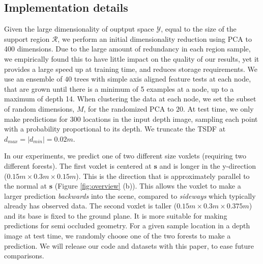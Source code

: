 \documentclass[10pt,twocolumn,letterpaper]{article}
\newcommand{\pixelidx}{\mathbf{s}}
\newcommand{\voxelgrid}{\mathcal{V}}
\newcommand{\note}[1]{\textcolor{blue}{NOTE: #1}}
\begin{document}
\subsection{Implementation details}
Given the large dimensionality of ouptput space $\mathcal{Y}$, equal to the size of the support region $\mathcal{R}$, we perform an initial dimensionality reduction using PCA to 400 dimensions.
Due to the large amount of redundancy in each region sample, we empirically found this to have little impact on the quality of our results, yet it provides a large speed up at training time, and reduces storage requirements.
We use an ensemble of $40$ trees with simple axis aligned feature tests at each node, that are grown until there is a minimum of 5 examples at a node, up to a maximum of depth 14.
When clustering the data at each node, we set the subset of random dimensions, $M$, for the randomized PCA to $20$.
At test time, we only make predictions for 300 locations in the input depth image, sampling each point with a probability proportional to its depth.
We truncate the TSDF at $d_{max} = |d_{min}| = 0.02m$.

In our experiments, we predict one of two different size voxlets (requiring two different forests).
The first voxlet is centered at $\pixelidx$ and is longer in the y-direction ($0.15m \times 0.3m \times 0.15m$).
This is the direction that is approximately parallel to the normal at $\pixelidx$ (Figure \ref{fig:overview} (b)).
This allows the voxlet to make a larger prediction \emph{backwards} into the scene, compared to \emph{sideways} which typically already has observed data.
The second voxlet is taller ($0.15m \times 0.3m \times 0.375m$) and its base is fixed to the ground plane.
It is more suitable for making predictions for semi occluded geometry.
For a given sample location in a depth image at test time, we randomly choose one of the two forests to make a prediction.
We will release our code and datasets with this paper, to ease future comparisons.
\end{document}
